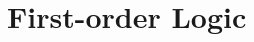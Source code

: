 \documentclass[open-logic-part]{subfiles}
\begin{document}
\part{First-order Logic}






\end{document}
